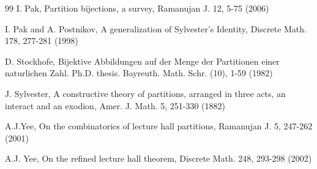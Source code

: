 \documentclass{amsart}
\begin{document}
\begin{thebibliography}{99}
 I. Pak, Partition bijections, a survey, Ramanujan J. 12, 5-75 (2006)

 I. Pak and A. Postnikov, A generalization of Sylvester's Identity, Discrete Math. 178, 277-281 (1998)

 D. Stockhofe, Bijektive Abbildungen auf der Menge der Partitionen einer naturlichen Zahl. Ph.D. thesis. Bayreuth. Math. Schr. (10), 1-59 (1982)

 J. Sylvester, A constructive theory of partitions, arranged in three acts, an interact and an exodion, Amer. J. Math. 5, 251-330 (1882) 

 A.J.Yee, On the combinatorics of lecture hall partitions, Ramanujan J. 5, 247-262 (2001)

 A.J. Yee, On the refined lecture hall theorem, Discrete Math. 248,  293-298 (2002)

\end{thebibliography}
\end{document}
